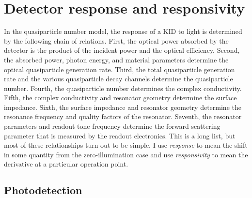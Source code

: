\section{Detector response and responsivity}
\label{sec:theory.response}

In the quasiparticle number model, the response of a KID to light is determined by the following chain of relations.
First, the optical power absorbed by the detector is the product of the incident power and the optical efficiency.
Second, the absorbed power, photon energy, and material parameters determine the optical quasiparticle generation rate.
Third, the total quasiparticle generation rate and the various quasiparticle decay channels determine the quasiparticle number.
Fourth, the quasiparticle number determines the complex conductivity.
Fifth, the complex conductivity and resonator geometry determine the surface impedance.
Sixth, the surface impedance and resonator geometry determine the resonance frequency and quality factors of the resonator.
Seventh, the resonator parameters and readout tone frequency determine the forward scattering parameter that is measured by the readout electronics.
This is a long list, but most of these relationships turn out to be simple.
I use \textit{response} to mean the shift in some quantity from the zero-illumination case and use \textit{responsivity} to mean the derivative at a particular operation point.


\subsection{Photodetection}
\label{sec:theory.response.photodetection}

